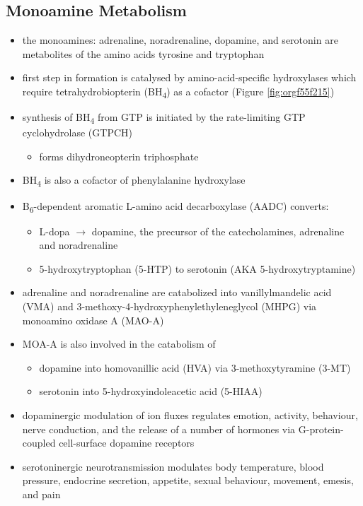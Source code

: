 \documentclass{scrartcl}
\begin{document}
\subsection{Monoamine Metabolism}
\label{sec:orgb6031aa}
\begin{itemize}
\item the monoamines: adrenaline, noradrenaline, dopamine, and serotonin
are metabolites of the amino acids tyrosine and tryptophan
\item first step in formation is catalysed by amino-acid-specific
hydroxylases which require tetrahydrobiopterin (BH\textsubscript{4}) as a cofactor
(Figure \ref{fig:orgf55f215})
\item synthesis of BH\textsubscript{4} from GTP is initiated by the rate-limiting GTP
cyclohydrolase (GTPCH)
\begin{itemize}
\item forms dihydroneopterin triphosphate
\end{itemize}
\item BH\textsubscript{4} is also a cofactor of phenylalanine hydroxylase
\item B\textsubscript{6}-dependent aromatic L-amino acid decarboxylase (AADC) converts:
\begin{itemize}
\item L-dopa \(\to\) dopamine, the precursor of the catecholamines,
adrenaline and noradrenaline
\item 5-hydroxytryptophan (5-HTP) to serotonin (AKA 5-hydroxytryptamine)
\end{itemize}
\item adrenaline and noradrenaline are catabolized into vanillylmandelic
acid (VMA) and 3-methoxy-4-hydroxyphenylethyleneglycol (MHPG) via
monoamino oxidase A (MAO-A)
\item MOA-A is also involved in the catabolism of
\begin{itemize}
\item dopamine into homovanillic acid (HVA) via 3-methoxytyramine (3-MT)
\item serotonin into 5-hydroxyindoleacetic acid (5-HIAA)
\end{itemize}
\item dopaminergic modulation of ion fluxes regulates emotion, activity,
behaviour, nerve conduction, and the release of a number of hormones
via G-protein-coupled cell-surface dopamine
receptors
\item serotoninergic neurotransmission modulates body temperature, blood
pressure, endocrine secretion, appetite, sexual behaviour, movement,
emesis, and pain
\end{itemize}
\end{document}
